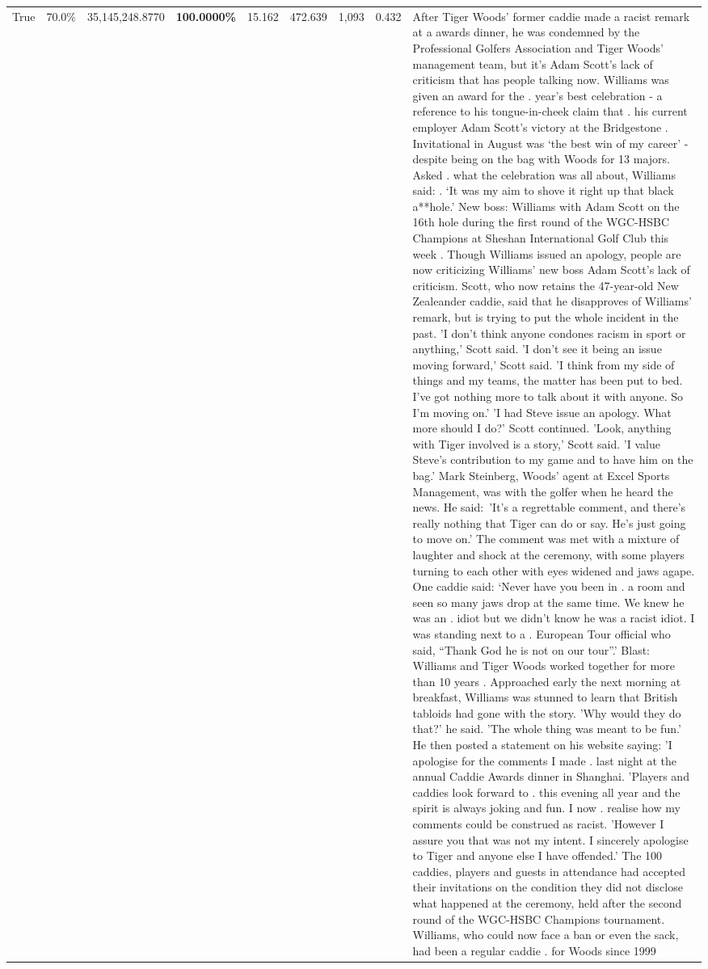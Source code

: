 \begin{table}[H]
\begin{tabular}{lllrlllll}
True & 70.0\% & 35,145,248.8770 & \bfseries \color{red} 100.0000\% & 15.162 & 472.639 & 1,093 & 0.432 & After Tiger Woods' former caddie made a racist remark at a awards dinner, he was condemned by the Professional Golfers Association and Tiger Woods' management team, but it's Adam Scott's lack of criticism that has people talking now. Williams was given an award for the . year’s best celebration - a reference to his tongue-in-cheek claim that . his current employer Adam Scott’s victory at the Bridgestone . Invitational in August was ‘the best win of my career’ - despite being on the bag with Woods for 13 majors. Asked . what the celebration was all about, Williams said: . ‘It was my aim to shove it right up that black a**hole.’ New boss: Williams with Adam Scott  on the 16th hole during the first round of the WGC-HSBC Champions at Sheshan International Golf Club this week . Though Williams issued an apology, people are now criticizing Williams' new boss Adam Scott's lack of criticism. Scott, who now retains the 47-year-old New Zealeander caddie, said that he disapproves of Williams' remark, but is trying to put the whole incident in the past. 'I don't think anyone condones racism in sport or anything,' Scott said. 'I don't see it being an issue moving forward,' Scott said. 'I think from my side of things and my teams, the matter has been put to bed. I've got nothing more to talk about it with anyone. So I'm moving on.' 'I had Steve issue an apology. What more should I do?' Scott continued. 'Look, anything with Tiger involved is a story,' Scott said. 'I value Steve's contribution to my game and to have him on the bag.' Mark Steinberg, Woods' agent at Excel Sports Management, was with the golfer when he heard the news. He said: 'It's a regrettable comment, and there's really nothing that Tiger can do or say. He's just going to move on.' The comment was met with a mixture of laughter and shock at the ceremony, with some players turning to each other with eyes widened and jaws agape. One caddie said: ‘Never have you been in . a room and seen so many jaws drop at the same time. We knew he was an . idiot but we didn’t know he was a racist idiot. I was standing next to a . European Tour official who said, “Thank God he is not on our tour”.’ Blast: Williams and Tiger Woods worked together for more than 10 years . Approached early the next morning at breakfast, Williams was stunned to learn that British tabloids had gone with the story. 'Why would they do that?' he said. 'The whole thing was meant to be fun.' He then posted a statement on his website saying: 'I apologise for the comments I made . last night at the annual Caddie Awards dinner in Shanghai. 'Players and caddies look forward to . this evening all year and the spirit is always joking and fun. I now . realise how my comments could be construed as racist. 'However I assure you that was not my intent. I sincerely apologise to Tiger and anyone else I have offended.' The 100 caddies, players and guests in attendance had accepted their invitations on the condition they did not disclose what happened at the ceremony, held after the second round of the WGC-HSBC Champions tournament. Williams, who could now face a ban or even the sack, had been a regular caddie . for Woods since 1999 
\end{tabular}
\end{table}
